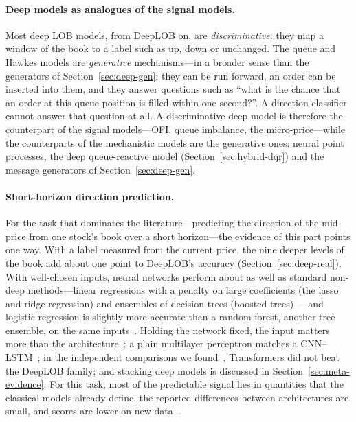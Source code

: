 \paragraph{Deep models as analogues of the signal models.} Most deep LOB
models, from DeepLOB on, are \emph{discriminative}: they map a window of the book to a label such as up, down
or unchanged. The queue and Hawkes models are \emph{generative} mechanisms---in a broader sense than the generators of
Section~\ref{sec:deep-gen}: they can be run forward, an order can
be inserted into them, and they answer questions such as ``what is the chance that an order at this queue
position is filled within one second?''. A direction classifier cannot answer that question at all. A
discriminative deep model is therefore the counterpart of the signal models---OFI, queue imbalance, the
micro-price---while the counterparts of the mechanistic models are the generative ones: neural point processes,
the deep queue-reactive model (Section~\ref{sec:hybrid-dqr}) and the message generators of
Section~\ref{sec:deep-gen}.

\paragraph{Short-horizon direction prediction.} For the task that dominates the literature---predicting the
direction of the mid-price from one stock's book over a short horizon---the evidence of this part points one
way. With a label measured from the current price, the nine deeper levels of the book add about one point to
DeepLOB's accuracy (Section~\ref{sec:deep-real}).
With well-chosen inputs, neural networks perform about as well as standard non-deep methods---linear regressions with a penalty on large
coefficients (the lasso and ridge regression) and ensembles of decision trees (boosted trees)~\citep{aitsahalia2026}---and
logistic regression is slightly more accurate than a random forest, another tree ensemble, on the
same inputs~\citep{easley2021}. Holding the network fixed, the input matters more than the
architecture~\citep{lucchese2024,kolm2023}; a plain multilayer perceptron matches a CNN--LSTM~\citep{briola2020};
in the independent comparisons we found~\citep{bilokon2023transformers,zhong2025lobench},
Transformers did not beat the DeepLOB family; and stacking deep models is discussed in
Section~\ref{sec:meta-evidence}. For this task, most of the predictable signal lies in quantities that the classical
models already define, the reported differences between architectures are small, and scores are lower on new
data~\citep{prata2024}.

